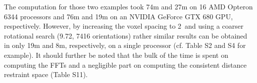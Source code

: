{}

The computation for those two examples took 74m and 27m on 16 AMD Opteron 6344
processors and 76m and 19m on an NVIDIA GeForce GTX 680 GPU, respectively.
However, by increasing the voxel spacing to 2\Angstrom\ and using a coarser rotational
search (9.72\Deg, 7416 orientations) rather similar results can be obtained in
only 19m and 8m, respectively, on a single processor (cf. Table S2 and S4 for
example). It should further be noted that the bulk of the time is spent on
computing the FFTs and a negligible part on computing the consistent distance
restraint space (Table S11).

